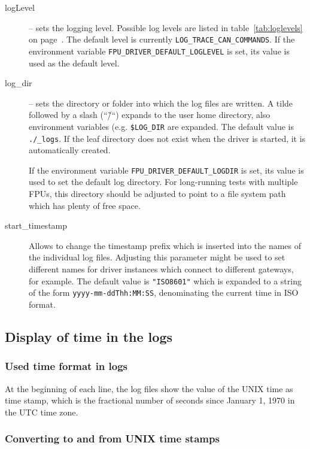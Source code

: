 \documentclass[11pt,a4paper]{report}
\begin{document}
\begin{description}
\item[logLevel] -- sets the logging level. Possible log levels are
  listed in table~\ref{tab:loglevels} on
  page~\pageref{tab:loglevels}. The default level is currently
  \texttt{LOG\_TRACE\_CAN\_COMMANDS}. If the environment variable
  \texttt{FPU\_DRIVER\_DEFAULT\_LOGLEVEL} is set, its value is used as
  the default level.
  
  \item [log\_dir] -- sets the directory or folder into which the log
    files are written. A tilde followed by a slash (``\~/``) expands
    to the user home directory, also environment variables
    (e.g. \texttt{\$LOG\_DIR} are expanded. The default value is
    \texttt{./\_logs}. If the leaf directory does not exist when the
    driver is started, it is automatically created.

    If the environment variable \texttt{FPU\_DRIVER\_DEFAULT\_LOGDIR}
    is set, its value is used to set the default log directory.  For
    long-running tests with multiple FPUs, this directory should be
    adjusted to point to a file system path which has plenty of free
    space.

  \item[start\_timestamp] Allows to change the timestamp prefix which
    is inserted into the names of the individual log files.  Adjusting
    this parameter might be used to set different names for driver
    instances which connect to different gateways, for example.  The
    default value is \verb+"ISO8601"+ which is expanded to a string of
    the form \verb+yyyy-mm-ddThh:MM:SS+, denominating the current time
    in ISO format.
    
\end{description}

\subsection{Display of time in the logs}
\subsubsection{Used time format in logs}
At the beginning of each line, the log files show the value of the
UNIX time as time stamp, which is the fractional number of seconds
since January 1, 1970 in the UTC time zone. 

\subsubsection{Converting to and from UNIX time stamps}
\end{document}
